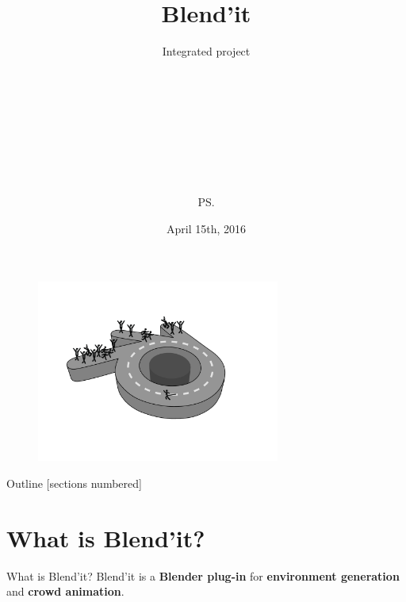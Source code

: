 \documentclass{beamer}
\title{Blend'it}
\subtitle{Integrated project}
\author{\bb\\ \gc\\ \dl\\ \vl\\ \om\\ \mr\\ \me\\ \js\\ \ps\\}
\date{April 15th, 2016}
\begin{document}
\begin{frame}
\begin{figure}
  \begin{center}
    \includegraphics[width=8cm]{logo.pdf}
  \end{center}
\end{figure}
\end{frame}

\maketitle

\bgroup
{}
\begin{frame}[plain]{}
\end{frame}
\egroup

\begin{frame}{Outline}
  [sections numbered]
  \tableofcontents[hideallsubsections]
\end{frame}

\section{What is Blend'it?}
\begin{frame}{What is Blend'it?}
  Blend'it is a \textbf{Blender plug-in} for \textbf<1>{environment generation} and \textbf<2>{crowd animation}.
  
  \begin{figure}%
\centering
{} ~ 
 ~ 
\\
\label{3figs}

\end{figure}
\end{frame}
\end{document}
